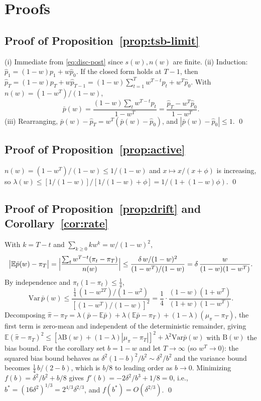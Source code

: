 \documentclass[twocolumn,10pt]{article}
\newcommand{\E}{\mathbb{E}}
\newcommand{\Var}{\mathrm{Var}}
\begin{document}
\section{Proofs}\label{app:proofs}

\subsection{Proof of Proposition~\ref{prop:tsb-limit}}
(i) Immediate from \eqref{eq:disc-post} since $s(w),n(w)$ are finite.
(ii) Induction: $\hat p_1=(1-w)p_1+w\hat p_0$. If the closed form holds at
$T-1$, then
$\hat p_T=(1-w)p_T+w\hat p_{T-1}=(1-w)\sum_{t=1}^{T}w^{T-t}p_t+w^{T}\hat p_0$.
With $n(w)=(1-w^{T})/(1-w)$,
\[
\bar p(w)=\frac{(1-w)\sum_t w^{T-t}p_t}{1-w^{T}}
=\frac{\hat p_T-w^{T}\hat p_0}{1-w^{T}}.
\]
(iii) Rearranging, $\bar p(w)-\hat p_T=w^{T}(\bar p(w)-\hat p_0)$, and
$|\bar p(w)-\hat p_0|\le1$. \qed

\subsection{Proof of Proposition~\ref{prop:active}}
$n(w)=(1-w^{T})/(1-w)\le1/(1-w)$ and $x\mapsto x/(x+\phi)$ is increasing,
so $\lambda(w)\le[1/(1-w)]/[1/(1-w)+\phi]=1/(1+(1-w)\phi)$. \qed

\subsection{Proof of Proposition~\ref{prop:drift} and
Corollary~\ref{cor:rate}}
With $k=T-t$ and $\sum_{k\ge0}kw^k=w/(1-w)^2$,
\[
\bigl|\E\bar p(w)-\pi_T\bigr|
=\Bigl|\frac{\sum_t w^{T-t}(\pi_t-\pi_T)}{n(w)}\Bigr|
\le\frac{\delta\,w/(1-w)^2}{(1-w^{T})/(1-w)}
=\delta\,\frac{w}{(1-w)(1-w^{T})}.
\]
By independence and $\pi_t(1-\pi_t)\le\tfrac14$,
\[
\Var\,\bar p(w)\le\frac{\tfrac14\,(1-w^{2T})/(1-w^{2})}
{[(1-w^{T})/(1-w)]^{2}}
=\frac14\cdot\frac{(1-w)(1+w^{T})}{(1+w)(1-w^{T})}.
\]
Decomposing
$\hat\pi-\pi_T=\lambda(\bar p-\E\bar p)+\lambda(\E\bar p-\pi_T)+(1-\lambda)(\mu_\pi-\pi_T)$,
the first term is zero-mean and independent of the deterministic
remainder, giving
$\E(\hat\pi-\pi_T)^2\le[\lambda\mathrm{B}(w)+(1-\lambda)|\mu_\pi-\pi_T|]^2
+\lambda^2\Var\bar p(w)$ with $\mathrm{B}(w)$ the bias bound. For the
corollary set $b=1-w$ and let $T\to\infty$ (so $w^{T}\to0$): the squared
bias bound behaves as $\delta^2(1-b)^2/b^2\sim\delta^2/b^2$ and the
variance bound becomes $\tfrac14\, b/(2-b)$, which is $b/8$ to leading
order as $b\to0$. Minimizing $f(b)=\delta^2/b^2+b/8$ gives
$f'(b)=-2\delta^2/b^3+1/8=0$, i.e.,
$b^{*}=(16\delta^{2})^{1/3}=2^{4/3}\delta^{2/3}$, and
$f(b^{*})=O(\delta^{2/3})$. \qed
\end{document}

